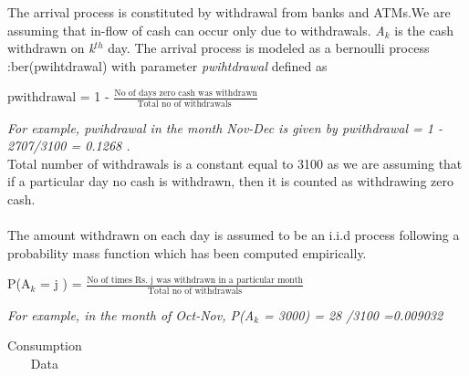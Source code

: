 \documentclass[12pt]{article}
\newcommand*\textfrac[2]{
  \frac{\text{#1}}{\text{#2}}
}
\begin{document}
\begin{small}
    The arrival process is constituted by withdrawal from banks and ATMs.We are assuming that in-flow of cash can occur only due to withdrawals. \textit{A$_{k}$} is the cash withdrawn on \textit{k$^{th}$} day. The arrival process is modeled as a bernoulli process :ber(pwihtdrawal) with parameter \textit{pwihtdrawal} defined as
    \begin{center}
    pwithdrawal = 1 -  $\textfrac{No of days zero cash was withdrawn}{Total no of withdrawals }$
    \end{center}
   \textit{ For example, pwihdrawal in the month Nov-Dec is given by pwithdrawal = 1 - 2707/3100 = 0.1268 .}\\Total number of withdrawals is a constant equal to 3100 as we are assuming that if a particular day no cash is withdrawn, then it is counted as withdrawing zero cash.\\\\
    The amount withdrawn on each day is assumed to be an i.i.d process following a probability mass function which has been computed empirically.  
    \begin{center}
    P(A$_{k}$ = j ) = $\textfrac{No of times Rs. j was withdrawn in a particular month}{Total no of withdrawals}$
    \end{center}
    \textit{For example, in the month of Oct-Nov, P(A$_{k}$ = 3000) = 28 /3100 =0.009032}
 \begin{table}[H]
\centering
\caption{Consumption Data}

\begin{tabu} to 1\textwidth { | X[c] | X[c]  | X[c] | X[c] | X[c] | }
 \hline
 

\end{tabu}
\end{table}
\end{small}
\end{document}
